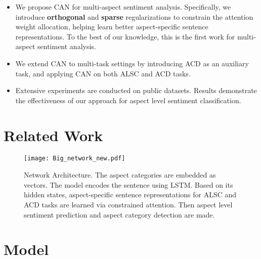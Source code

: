 \documentclass[11pt,a4paper]{article}
\begin{document}
\begin{itemize}
\vspace{-0.2cm}
\item We propose CAN for multi-aspect sentiment analysis. Specifically, we introduce {\bf orthogonal} and {\bf sparse} regularizations to constrain the attention weight allocation, helping learn better aspect-specific sentence representations. To the best of our knowledge, this is the first work for multi-aspect sentiment analysis.


\vspace{-0.2cm}
\item We extend CAN to multi-task settings by introducing ACD as an auxiliary task, and applying CAN on  both ALSC and ACD tasks. 

\vspace{-0.2cm}
\item Extensive experiments are conducted on public datasets. Results demonstrate the effectiveness of our approach for aspect level sentiment classification.  
\end{itemize}

\section{Related Work}

\begin{figure*}
\setlength{\abovecaptionskip}{0.2cm}   %
\setlength{\belowcaptionskip}{-0.3cm}   %
\centering
	\texttt{[image: Big\_network\_new.pdf]}
    \caption{Network Architecture. The aspect categories are embedded as vectors. The model encodes the sentence using LSTM. Based on its hidden states, aspect-specific sentence representations for ALSC and ACD tasks are learned via constrained attention. Then aspect level sentiment prediction and aspect category detection are made. }
    \label{network}
\end{figure*}

\section{Model}
\end{document}
